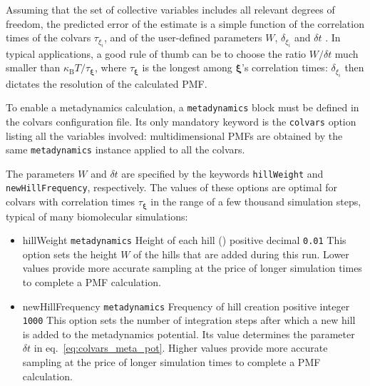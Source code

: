 Assuming that the set of collective variables includes all relevant degrees of freedom, the predicted error of the estimate is a simple function of the correlation times of the colvars $\tau_{\xi_{i}}$, and of the user-defined parameters $W$, $\delta_{\xi_{i}}$ and $\delta{}t$ \cite{Bussi2006}. 
In typical applications, a good rule of thumb can be to choose the ratio $W/\delta{}t$ much smaller than $\kappa_{\mathrm{B}}T/\tau_{\bm{\xi}}$, where $\tau_{\bm{\xi}}$ is the longest among $\bm{\xi}$'s correlation times: $\delta_{\xi_{i}}$ then dictates the resolution of the calculated PMF.


To enable a metadynamics calculation, a \texttt{metadynamics} block must be defined in the colvars configuration file. 
Its only mandatory keyword is the \texttt{colvars} option listing all the variables involved: multidimensional PMFs are obtained by the same \texttt{metadynamics} instance applied to all the colvars.

The parameters $W$ and $\delta{}t$ are specified by the keywords \texttt{hillWeight} and \texttt{newHillFrequency}, respectively.
The values of these options are optimal for colvars with correlation times $\tau_{\bm{\xi}}$ in the range of a few thousand simulation steps, typical of many biomolecular simulations:
\begin{itemize}

\item %
  \keydef
    {hillWeight}{%
    \texttt{metadynamics}}{%
    Height of each hill ()}{%
    positive decimal}{%
    \texttt{0.01}}{%
    This option sets the height $W$ of the hills that are added during
    this run.  Lower values provide more accurate sampling at the price
    of longer simulation times to complete a PMF calculation.}

\item %
  \keydef
    {newHillFrequency}{%
    \texttt{metadynamics}}{%
    Frequency of hill creation}{%
    positive integer}{%
    \texttt{1000}}{%
    This option sets the number of integration steps after which a new
    hill is added to the metadynamics potential.  Its value determines
    the parameter $\delta{}t$ in eq.~\ref{eq:colvars_meta_pot}.  Higher
    values provide more accurate sampling at the price of longer
    simulation times to complete a PMF calculation.}

\end{itemize}

